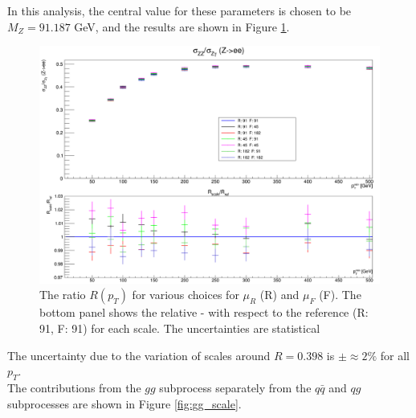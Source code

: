 \documentclass[11pt,a4paper]{report}
\begin{document}
In this analysis, the central value for these parameters is chosen to be $M_Z = 91.187$ GeV, and the results are shown in Figure \ref{fig:scalecompare}.
\begin{figure}[H]
\centering
\includegraphics[width=0.8\linewidth]{scale/nlo_scale_overlay.png}
\caption{The ratio $R(p_T)$ for various choices for $\mu_R$ (R) and $\mu_F$ (F). The bottom panel shows the relative - with respect to the reference (R: 91, F: 91) for each scale. The uncertainties are statistical}
\label{fig:scalecompare}
\end{figure}
The uncertainty due to the variation of scales around $R = 0.398$ is $\pm \approx 2\%$ for all $p_T$.\\
The contributions from the $gg$ subprocess separately from the $q\bar{q}$ and $qg$ subprocesses are shown in Figure \ref{fig:gg_scale}.
\end{document}
